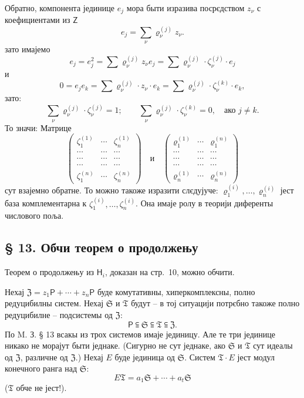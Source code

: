 \documentclass[11pt]{article}
\begin{document}
Обратно, компонента јединице \(e_j\) мора быти изразива посрєдством \(z_\nu\) с коефициентами из \(\mathsf Z\)
\[
e_j=\sum_\nu \varrho_\nu^{(j)}z_\nu .
\]
зато имајемо
\[
e_j=e_j^2=\sum \varrho_\nu^{(j)}z_\nu e_j
=\sum \varrho_\nu^{(j)}\cdot\zeta_\nu^{(j)}\cdot e_j
\]
и
\[
0=e_je_k=\sum \varrho_\nu^{(j)}\cdot z_\nu\cdot e_k
=\sum \varrho_\nu^{(j)}\cdot\zeta_\nu^{(k)}\cdot e_k,
\]
зато:
\[
\sum_\nu \varrho_\nu^{(j)}\cdot\zeta_\nu^{(j)}=1;
\qquad
\sum_\nu \varrho_\nu^{(j)}\cdot\zeta_\nu^{(k)}=0,\quad
\text{ако } j\ne k.
\]
То значи: Матрице
\[
\begin{pmatrix}
\zeta_1^{(1)} & \cdots & \zeta_n^{(1)}\\
\cdots & \cdots & \cdots\\
\cdots & \cdots & \cdots\\
\cdots & \cdots & \cdots\\
\zeta_1^{(n)} & \cdots & \zeta_n^{(n)}
\end{pmatrix}
\quad\text{и}\quad
\begin{pmatrix}
\varrho_1^{(1)} & \cdots & \varrho_1^{(n)}\\
\cdots & \cdots & \cdots\\
\cdots & \cdots & \cdots\\
\cdots & \cdots & \cdots\\
\varrho_n^{(1)} & \cdots & \varrho_n^{(n)}
\end{pmatrix}
\]
сут взајемно обратне. То можно такоже изразити слєдујуче: \(\varrho_1^{(i)},\ldots,\varrho_n^{(i)}\) јест база комплементарна к \(\zeta_1^{(i)},\ldots,\zeta_n^{(i)}\). Она имаје ролу в теорији диференты числового поља.

\subsection*{§ 13. Обчи теорем о продолжењу}\label{der-allgemeine-fortsetzungssatz}

Теорем о продолжењу из \(\mathsf{H}_i\), доказан на стр.~10, можно обчити.

Нехај \(\mathfrak Z=z_1\mathsf P+\cdots+z_n\mathsf P\) буде комутативны, хиперкомплексны, полно редуцибилны систем. Нехај \(\mathfrak S\) и \(\mathfrak T\) будут -- в тој ситуацији потрєбно такоже полно редуцибилне -- подсистемы од \(\mathfrak Z\):
\[
\mathsf P\subseteqq\mathfrak S\subseteqq\mathfrak T\subseteqq\mathfrak Z .
\]
По M. З. § 13 всакы из трох системов имаје јединицу. Але те три јединице никако не морајут быти једнаке. (Сигурно не сут једнаке, ако \(\mathfrak S\) и \(\mathfrak T\) сут идеалы од \(\mathfrak Z\), различне од \(\mathfrak Z\).) Нехај \(E\) буде јединица од \(\mathfrak S\). Систем \(\mathfrak T\cdot E\) јест модул конечного ранга над \(\mathfrak S\):
\[
E\mathfrak T=a_1\mathfrak S+\cdots+a_t\mathfrak S
\]
(\(\mathfrak T\) обче не јест!).
\end{document}
